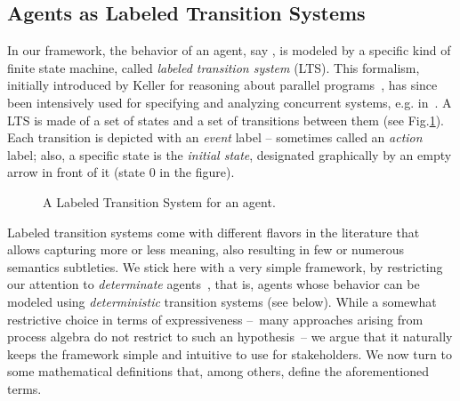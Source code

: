\subsection{Agents as Labeled Transition Systems}

In our framework, the behavior of an agent, say , is modeled by a specific kind of finite state machine, called \emph{labeled transition system} (LTS). This formalism, initially introduced by Keller for reasoning about parallel programs~\cite{Keller:1976}, has since been intensively used for specifying and analyzing concurrent systems, e.g. in~\cite{Milner:1989, Clarke:1989, Magee:1997}. A LTS is made of a set of states and a set of transitions between them (see Fig.\ref{image:framework-start-stop}). Each transition is depicted with an \emph{event} label -- sometimes called an \emph{action} label; also, a specific state is the \emph{initial state}, designated graphically by an empty arrow in front of it (state 0 in the figure). 

\begin{figure}[H]
\centering{}
  \caption{A Labeled Transition System for an  agent\label{image:framework-start-stop}.}
\end{figure}

Labeled transition systems come with different flavors in the literature that allows capturing more or less meaning, also resulting in few or numerous semantics subtleties. We stick here with a very simple framework, by restricting our attention to \emph{determinate} agents~\cite{Engelfriet:1985}, that is, agents whose behavior can be modeled using \emph{deterministic} transition systems (see below). While a somewhat restrictive choice in terms of expressiveness --~many approaches arising from process algebra do not restrict to such an hypothesis~-- we argue that it naturally keeps the framework simple and intuitive to use for stakeholders. We now turn to some mathematical definitions that, among others, define the aforementioned terms.


